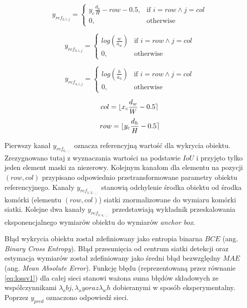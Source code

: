 \begin{equation}
y_{ref}_{2,i,j} = 
\begin{cases}
    y_c \frac{d_h}{H} - row - 0.5, & \text{if }  i = row \land j = col \\
    0,              & \text{otherwise}
\end{cases}
\label{eq:y_ref_yv1}
\end{equation}

\begin{equation}
y_{ref}_{3,i,j} = 
\begin{cases}
    log(\frac{w}{a_w}) & \text{if }  i = row \land j = col \\
    0,              & \text{otherwise}
\end{cases}
\label{eq:y_ref_wv1}
\end{equation}

\begin{equation}
y_{ref}_{4,i,j} = 
\begin{cases}
    log(\frac{h}{a_h}) & \text{if }  i = row \land j = col \\
    0,              & \text{otherwise}
\end{cases}
\label{eq:y_ref_hv1}
\end{equation}

\begin{equation}
col = \lfloor x_c \frac{d_w}{W} - 0.5\rceil
\label{eq:colv1}
\end{equation}
\begin{equation}
row = \lfloor y_c \frac{d_h}{H} - 0.5\rceil
\label{eq:rowv1}
\end{equation}


Pierwszy kanał $y_{ref}_{0,:,:}$ oznacza referencyjną wartość dla wykrycia obiektu.
Zrezygnowano tutaj z wyznaczania wartości na podstawie $IoU$ i przyjęto tylko jeden element maski za niezerowy. 
Kolejnym kanałom dla elementu na pozycji $(row, col)$ przypisano odpowiednio przetransformowane parametry obiektu referencyjnego. Kanały $y_{ref}_{1:2,:,:}$ stanowią odchylenie środka obiektu od środka komórki (elementu $(row, col)$) siatki znormalizowane do wymiaru komórki siatki.
Kolejne dwa kanały $y_{ref}_{3:4,:,:}$ przedstawiają wykładnik przeskalowania eksponencjalnego wymiarów obiektu do wymiarów \emph{anchor box}.

Błąd wykrycia obiektu został zdefiniowany jako entropia binarna $BCE$ (ang. \emph{Binary Cross Entropy}). 
Błąd przesunięcia od centrum siatki detekcji oraz estymacja wymiarów został zdefiniowany jako średni błąd bezwzględny $MAE$ (ang. \emph{Mean Absolute Error}).
Funkcję błędu (reprezentowaną przez równanie \eqref{eq:lossv1}) dla całej sieci stanowi ważona suma błędów składowych ze współczynnikami $\lambda_obj, \lambda_xy oraz \lambda_wh$ dobieranymi w sposób eksperymentalny. 
Poprzez $y_{pred}$ oznaczono odpowiedź sieci. 

